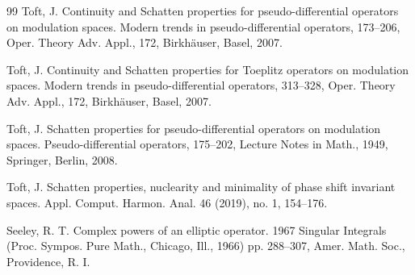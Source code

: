 \documentclass[12pt, reqno]{amsart}
\theoremstyle{definition}
\theoremstyle{remark}
\numberwithin{equation}{section}
\begin{document}
\begin{thebibliography}{99}
  Toft, J. Continuity and Schatten properties for pseudo-differential operators on modulation spaces. Modern trends in pseudo-differential operators, 173--206, Oper. Theory Adv. Appl., 172, Birkhäuser, Basel, 2007.

  Toft, J. Continuity and Schatten properties for Toeplitz operators on modulation spaces. Modern trends in pseudo-differential operators, 313–328, Oper. Theory Adv. Appl., 172, Birkhäuser, Basel, 2007. 

 Toft, J. Schatten properties for pseudo-differential operators on modulation spaces. Pseudo-differential operators, 175--202, Lecture Notes in Math., 1949, Springer, Berlin, 2008. 

 Toft, J. Schatten properties, nuclearity and minimality of phase shift invariant spaces. Appl. Comput. Harmon. Anal. 46 (2019), no. 1, 154--176.


 Seeley,  R. T. Complex powers of an elliptic operator. 1967 Singular Integrals (Proc. Sympos. Pure Math., Chicago, Ill., 1966) pp. 288--307, Amer. Math. Soc., Providence, R. I.


\end{thebibliography}
\end{document}
